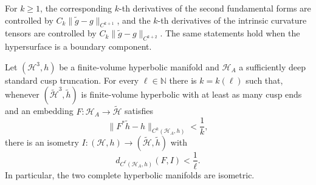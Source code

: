 \begin{remark}
\label{rem:chow-iv-hypersurface-geometry-higher-order-stability}
For \(k\ge1\), the corresponding \(k\)-th derivatives of the second
fundamental forms are controlled by \(C_k\|\widetilde g-g\|_{C^{k+1}}\), and
the \(k\)-th derivatives of the intrinsic curvature tensors are controlled by
\(C_k\|\widetilde g-g\|_{C^{k+2}}\).  The same statements hold when the
hypersurface is a boundary component.
\end{remark}

\begin{theorem}
\label{thm:chow-iv-isometry-near-almost-isometry}
Let \((\mathcal H^3,h)\) be a finite-volume hyperbolic manifold and
\(\mathcal H_A\) a sufficiently deep standard cusp truncation.  For every
\(\ell\in\mathbb N\) there is \(k=k(\ell)\) such that, whenever
\((\widetilde{\mathcal H}^3,\widetilde h)\) is finite-volume hyperbolic with at
least as many cusp ends and an embedding
\(F:\mathcal H_A\to\widetilde{\mathcal H}\) satisfies
\[
 \|F^*\widetilde h-h\|_{C^k(\mathcal H_A,h)}<\frac1k,
\]
there is an isometry \(I:(\mathcal H,h)\to
(\widetilde{\mathcal H},\widetilde h)\) with
\[
 d_{C^\ell(\mathcal H_A,h)}(F,I)<\frac1\ell.
\]
In particular, the two complete hyperbolic manifolds are isometric.
\end{theorem}

